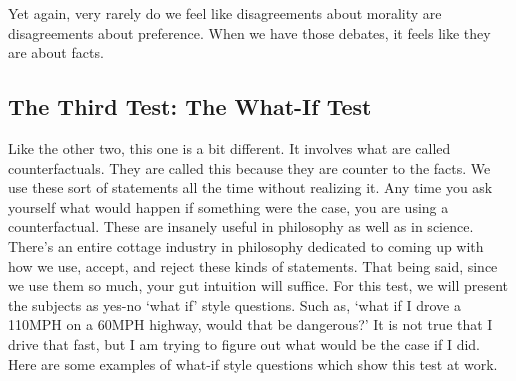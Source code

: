 Yet again, very rarely do we feel like disagreements about morality are disagreements about preference. When we have those debates, it feels like they are about facts.
\subsection{The Third Test: The What-If Test}

Like the other two, this one is a bit different. It involves what are called counterfactuals. They are called this because they are counter to the facts. We use these sort of statements all the time without realizing it. Any time you ask yourself what would happen if something were the case, you are using a counterfactual. These are insanely useful in philosophy as well as in science. There's an entire cottage industry in philosophy dedicated to coming up with how we use, accept, and reject these kinds of statements. That being said, since we use them so much, your gut intuition will suffice. For this test, we will present the subjects as yes-no `what if' style questions. Such as, ‘what if I drove a 110MPH on a 60MPH highway, would that be dangerous?’ It is not true that I drive that fast, but I am trying to figure out what would be the case if I did. Here are some examples of what-if style questions which show this test at work.
 

